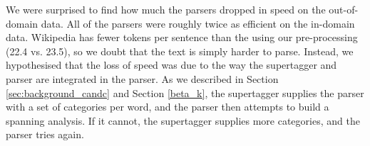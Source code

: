 
We were surprised to find how much the parsers dropped in speed on the
out-of-domain data. All of the parsers were roughly twice as efficient on the
in-domain data. Wikipedia has fewer tokens per sentence than the \wsj using our
pre-processing (22.4 vs. 23.5), so we doubt that the text is simply harder to
parse. Instead, we hypothesised that the loss of speed was due to the way the
supertagger and parser are integrated in the \candc parser. As we described in
Section \ref{sec:background_candc} and Section \ref{beta_k}, the supertagger
supplies the parser with a set of categories per word, and the parser then
attempts to build a spanning analysis. If it cannot, the supertagger supplies
more categories, and the parser tries again.


